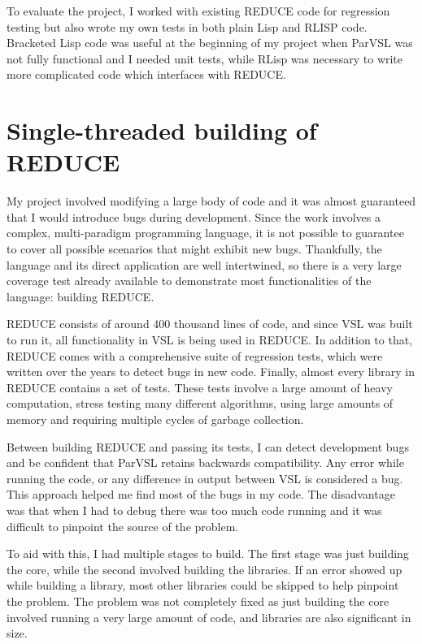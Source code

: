 To evaluate the project, I worked with existing REDUCE code for regression testing
but also wrote my own tests in both plain Lisp and RLISP code.
Bracketed Lisp code was useful at the beginning of my project when ParVSL was not
fully functional and I needed unit tests, while RLisp was necessary to write
more complicated code which interfaces with REDUCE.

\section{Single-threaded building of REDUCE}

My project involved modifying a large body of code and it was almost guaranteed
that I would introduce bugs during development. Since the work involves a complex,
multi-paradigm programming language, it is not possible to guarantee to cover all
possible scenarios that might exhibit new bugs. Thankfully, the language and its
direct application are well intertwined, so there is a very large coverage test already
available to demonstrate most functionalities of the language: building REDUCE.

REDUCE consists of around 400 thousand lines of code, and since VSL was built to
run it, all functionality in VSL is being used in REDUCE. In addition to that,
REDUCE comes with a comprehensive suite of regression tests, which were written over the
years to detect bugs in new code. Finally, almost every library in REDUCE contains a
set of tests. These tests involve a large amount of heavy computation, stress testing
many different algorithms, using large amounts of memory and requiring multiple cycles
of garbage collection.

Between building REDUCE and passing its tests, I can detect development bugs and be
confident that ParVSL retains backwards compatibility. Any error while running the code,
or any difference in output between VSL is considered a bug. This approach helped me
find most of the bugs in my code. The disadvantage was that when I had to debug there
was too much code running and it was difficult to pinpoint the source of the problem.

To aid with this, I had multiple stages to build. The first stage was just building
the core, while the second involved building the libraries. If an error showed up while
building a library, most other libraries could be skipped to help pinpoint the problem.
The problem was not completely fixed as just building the core involved running
a very large amount of code, and libraries are also significant in size.

